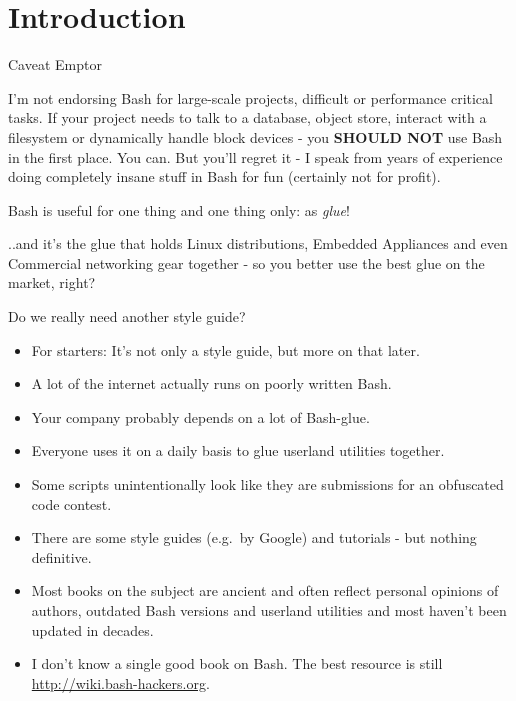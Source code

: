 \section{Introduction}\label{introduction}

\begin{frame}{Caveat Emptor}

I'm not endorsing Bash for large-scale projects, difficult or
performance critical tasks. If your project needs to talk to a database,
object store, interact with a filesystem or dynamically handle block
devices - you \textbf{SHOULD NOT} use Bash in the first place. You can.
But you'll regret it - I speak from years of experience doing completely
insane stuff in Bash for fun (certainly not for profit).

\vfill
Bash is useful for one thing and one thing only: as \emph{glue}!

\vfill

..and it's the glue that holds Linux distributions, Embedded Appliances
and even Commercial networking gear together - so you better use the
best glue on the market, right?

\end{frame}

\begin{frame}{Do we really need another style guide?}

\begin{itemize}
\itemsep1pt\parskip0pt
\item
  For starters: It's not only a style guide, but more on that later.
\item
  A lot of the internet actually runs on poorly written Bash.
\item
  Your company probably depends on a lot of Bash-glue.
\item
  Everyone uses it on a daily basis to glue userland utilities together.
\item
  Some scripts unintentionally look like they are submissions for an
  obfuscated code contest.
\item
  There are some style guides (e.g.~by Google) and tutorials - but
  nothing definitive.
\item
  Most books on the subject are ancient and often reflect personal
  opinions of authors, outdated Bash versions and userland utilities and
  most haven't been updated in decades.
\item
  I don't know a single good book on Bash. The best resource is still
  \url{http://wiki.bash-hackers.org}.
\end{itemize}

\end{frame}

